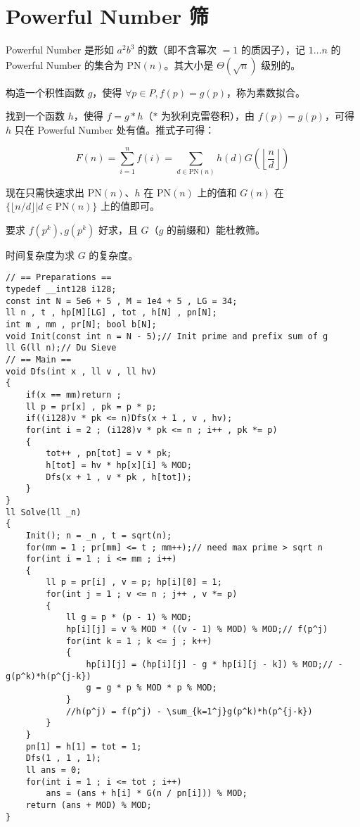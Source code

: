 \section{Powerful Number 筛}

Powerful Number 是形如 $a^2b^3$ 的数（即不含幂次 $=1$ 的质因子），记 $1\dots n$ 的 Powerful Number 的集合为 $\mathrm{PN}(n)$。其大小是 $\Theta(\sqrt{n})$ 级别的。

构造一个积性函数 $g$，使得 $\forall p \in P, f(p) = g(p)$，称为素数拟合。

找到一个函数 $h$，使得 $f = g * h$（$*$ 为狄利克雷卷积），由 $f(p)=g(p)$，可得 $h$ 只在 Powerful Number 处有值。推式子可得：

$$
F(n) = \sum\limits_{i=1}^n f(i) = \sum_{d\in\mathrm{PN}(n)}h(d)G(\left\lfloor\frac{n}{d}\right\rfloor)
$$

现在只需快速求出 $\mathrm{PN}(n)$、$h$ 在 $\mathrm{PN}(n)$ 上的值和 $G(n)$ 在 $\{\lfloor n/d\rfloor | d \in \mathrm{PN}(n)\}$ 上的值即可。

要求 $f(p^k),g(p^k)$ 好求，且 $G$（$g$ 的前缀和）能杜教筛。

时间复杂度为求 $G$ 的复杂度。

\begin{verbatim}
// == Preparations ==
typedef __int128 i128;
const int N = 5e6 + 5 , M = 1e4 + 5 , LG = 34;
ll n , t , hp[M][LG] , tot , h[N] , pn[N];
int m , mm , pr[N]; bool b[N];
void Init(const int n = N - 5);// Init prime and prefix sum of g
ll G(ll n);// Du Sieve
// == Main ==
void Dfs(int x , ll v , ll hv)
{
    if(x == mm)return ;
    ll p = pr[x] , pk = p * p;
    if((i128)v * pk <= n)Dfs(x + 1 , v , hv);
    for(int i = 2 ; (i128)v * pk <= n ; i++ , pk *= p)
    {
        tot++ , pn[tot] = v * pk;
        h[tot] = hv * hp[x][i] % MOD;
        Dfs(x + 1 , v * pk , h[tot]);
    }
}
ll Solve(ll _n)
{
    Init(); n = _n , t = sqrt(n);
    for(mm = 1 ; pr[mm] <= t ; mm++);// need max prime > sqrt n
    for(int i = 1 ; i <= mm ; i++)
    {
        ll p = pr[i] , v = p; hp[i][0] = 1;
        for(int j = 1 ; v <= n ; j++ , v *= p)
        {
            ll g = p * (p - 1) % MOD; 
            hp[i][j] = v % MOD * ((v - 1) % MOD) % MOD;// f(p^j)
            for(int k = 1 ; k <= j ; k++)
            {
                hp[i][j] = (hp[i][j] - g * hp[i][j - k]) % MOD;// - g(p^k)*h(p^{j-k})
                g = g * p % MOD * p % MOD;
            }
            //h(p^j) = f(p^j) - \sum_{k=1^j}g(p^k)*h(p^{j-k})
        }
    }
    pn[1] = h[1] = tot = 1; 
    Dfs(1 , 1 , 1);
    ll ans = 0;
    for(int i = 1 ; i <= tot ; i++)
        ans = (ans + h[i] * G(n / pn[i])) % MOD;
    return (ans + MOD) % MOD;
}
\end{verbatim}